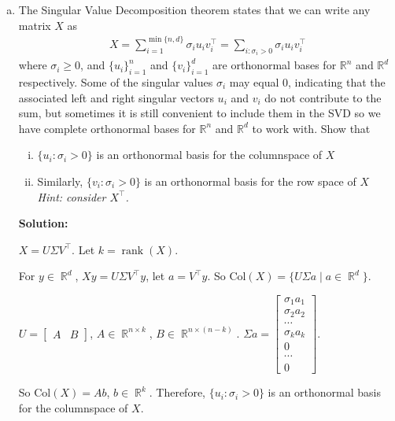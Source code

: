 \documentclass{article}
\DeclareMathOperator{\rank}{\mathrm{rank}}
\DeclareMathOperator{\R}{\mathbb{R}}
\newenvironment{solution}{\color{blue} \smallskip \textbf{Solution:}}{}
\begin{document}
\begin{enumerate}[(a)]
    \newpage
    \item
    The Singular Value Decomposition theorem states that we can write any matrix $X$ as 
    \begin{align*}
    X = \sum_{i=1}^{\min\{n,d\}} \sigma_{i} u_i v_i^{\top} = \sum_{i:\sigma_i > 0}\sigma_{i} u_i v_i^{\top}
    \end{align*}
    where $\sigma_{i} \ge 0$, and $\{u_i\}_{i=1}^n$ and $\{v_i\}_{i=1}^d$ are orthonormal bases for $\mathbb R^n$ and $\mathbb R^d$ respectively. Some of the singular values $\sigma_i$ may equal 0, indicating that the associated left and right singular vectors $u_i$ and $v_i$ do not contribute to the sum, but sometimes it is still convenient to include them in the SVD so we have complete orthonormal bases for $\mathbb R^n$ and $\mathbb R^d$ to work with.
    Show that 
    \begin{enumerate}[(i)]
    	\item $\{u_i : \sigma_i > 0\}$ is an orthonormal basis for the columnspace of $X$ 
    	\item Similarly, $\{v_i : \sigma_i > 0\}$ is an orthonormal basis for the row space of $X$  \\ \emph{Hint: consider $X^\top$.}
    \end{enumerate}

    \begin{solution}
        
        $X = U\Sigma V^\top$. Let $k = \rank(X)$.

        For $y \in \R^d$, $Xy = U\Sigma V^\top y$, let $a = V^\top y$.
        So $\text{Col}(X) = \{U\Sigma a \mid a \in \R^d\}$.

        $U = \begin{bmatrix}A & B\end{bmatrix}$, $A \in \R^{n \times k}$, 
        $B \in \R^{n \times (n - k)}$. $\Sigma a = \begin{bmatrix}
            \sigma_1 a_1 \\
            \sigma_2 a_2 \\
            \cdots \\
            \sigma_k a_k \\
            0 \\
            \cdots \\
            0
        \end{bmatrix}$.

        So $\text{Col}(X) = Ab$, $b \in \R^k$. Therefore, $\{u_i : \sigma_i > 0\}$ is an orthonormal basis for the columnspace of $X$.


\end{solution}
\end{enumerate}
\end{document}
